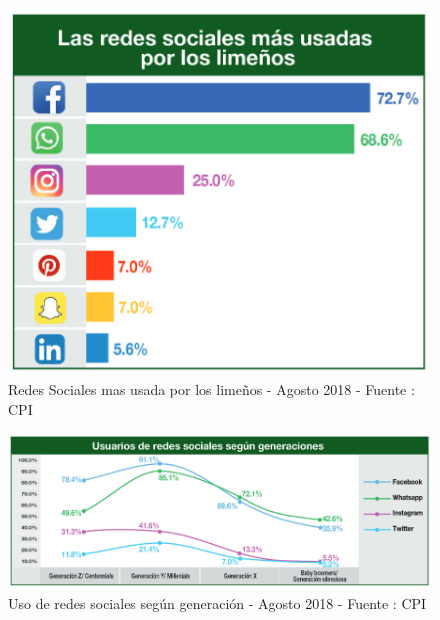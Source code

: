 \begin{figure}
\centering
\includegraphics[scale=0.7]{chapters/img/Ch01_UsoRedesSocialesLima.PNG}
\caption{Redes Sociales mas usada por los lime\~nos - Agosto 2018 - Fuente : CPI}
\end{figure}

\begin{figure}
\centering
\includegraphics[scale=0.5]{chapters/img/Ch01_UsoRedesSocialesGeneracion.PNG}
\caption{Uso de redes sociales seg\'un generaci\'on - Agosto 2018 - Fuente : CPI}
\end{figure}



\cleardoublepage
